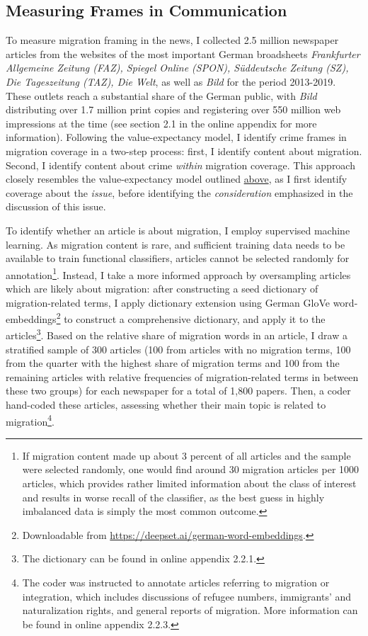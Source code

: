 \documentclass[
  12pt,
]{article}
\begin{document}
\hypertarget{measuring-frames-in-communication}{%
\subsection{Measuring Frames in Communication}\label{measuring-frames-in-communication}}

To measure migration framing in the news, I collected 2.5 million newspaper articles from the websites of the most important German broadsheets \emph{Frankfurter Allgemeine Zeitung (FAZ), Spiegel Online (SPON), Süddeutsche Zeitung (SZ), Die Tageszeitung (TAZ), Die Welt}, as well as \emph{Bild} for the period 2013-2019. These outlets reach a substantial share of the German public, with \emph{Bild} distributing over 1.7 million print copies and registering over 550 million web impressions at the time (see section 2.1 in the online appendix for more information). Following the value-expectancy model, I identify crime frames in migration coverage in a two-step process: first, I identify content about migration. Second, I identify content about crime \emph{within} migration coverage. This approach closely resembles the value-expectancy model outlined \protect\hyperlink{framing-effects}{above}, as I first identify coverage about the \emph{issue}, before identifying the \emph{consideration} emphasized in the discussion of this issue.

To identify whether an article is about migration, I employ supervised machine learning. As migration content is rare, and sufficient training data needs to be available to train functional classifiers, articles cannot be selected randomly for annotation\footnote{If migration content made up about 3 percent of all articles and the sample were selected randomly, one would find around 30 migration articles per 1000 articles, which provides rather limited information about the class of interest and results in worse recall of the classifier, as the best guess in highly imbalanced data is simply the most common outcome.}. Instead, I take a more informed approach by oversampling articles which are likely about migration: after constructing a seed dictionary of migration-related terms, I apply dictionary extension using German GloVe word-embeddings\footnote{Downloadable from \url{https://deepset.ai/german-word-embeddings}.} to construct a comprehensive dictionary, and apply it to the articles\footnote{The dictionary can be found in online appendix 2.2.1.}. Based on the relative share of migration words in an article, I draw a stratified sample of 300 articles (100 from articles with no migration terms, 100 from the quarter with the highest share of migration terms and 100 from the remaining articles with relative frequencies of migration-related terms in between these two groups) for each newspaper for a total of 1,800 papers. Then, a coder hand-coded these articles, assessing whether their main topic is related to migration\footnote{The coder was instructed to annotate articles referring to migration or integration, which includes discussions of refugee numbers, immigrants' and naturalization rights, and general reports of migration. More information can be found in online appendix 2.2.3.}.
\end{document}
